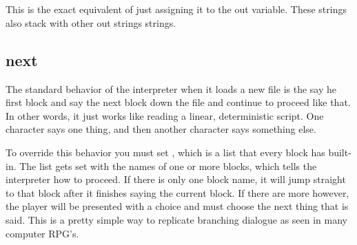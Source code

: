 \begin{SSCodeBox}
\scitea{\{} \\
\scitea{;} \\
\scitea{\}}
\end{SSCodeBox}

This is the exact equivalent of just assigning it to the out variable.  These strings also stack with other out strings strings.

\subsection{next}

The standard behavior of the interpreter when it loads a new file is the say he first block and say the next block down the file and continue to proceed like that.  In other words, it just works like reading a linear, deterministic script.  One character says one thing, and then another character says something else.

To override this behavior you must set , which is a list that every block has built-in.  The  list gets set with the names of one or more blocks, which tells the interpreter how to proceed.  If there is only one block name, it will jump straight to that block after it finishes saying the current block.  If there are more however, the player will be presented with a choice and must choose the next thing that is said.  This is a pretty simple way to replicate branching dialogue as seen in many computer RPG's.  

\begin{SSCodeBox}
 \\
 \\
\scitea{} \\
\scitea{\{} \\
\scitea{;} \\
\scitea{\}} \\
\scitea{} \\
\scitea{\{} \\
\scitea{;} \\
\scitea{\}} \\
\scitea{} \\
\scitea{\{} \\
\scitea{;} \\
\scitea{} \\
\scitea{=} \\
 \\
 \\
 \\
\scitea{\}} \\
\scitea{} \\
\end{SSCodeBox}

